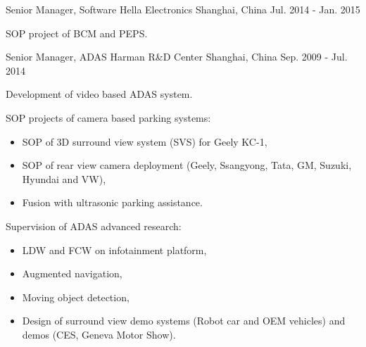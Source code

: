 \documentclass[../resume.tex]{subfiles}
\begin{document}
\begin{cventries}
  \cventry
    {Senior Manager, Software} %
    {Hella Electronics} %
    {Shanghai, China} %
    {Jul. 2014 - Jan. 2015} %
    {
      \begin{cvitems}
        \item SOP project of BCM and PEPS.
      \end{cvitems}
    }

  \cventry
    {Senior Manager, ADAS} %
    {Harman R\&D Center} %
    {Shanghai, China} %
    {Sep. 2009 - Jul. 2014} %
    {
      \begin{cvitems}
        \item Development of video based ADAS system.
        \item SOP projects of camera based parking systems:
          \begin{itemize}
            \item SOP of 3D surround view system (SVS) for Geely KC-1,
            \item SOP of rear view camera deployment (Geely, Ssangyong, Tata, GM, Suzuki, Hyundai and VW),
            \item Fusion with ultrasonic parking assistance.
           \end{itemize}
        \item Supervision of ADAS advanced research:
          \begin{itemize}
            \item LDW and FCW on infotainment platform,
            \item Augmented navigation,
            \item Moving object detection,
            \item Design of surround view demo systems (Robot car and OEM vehicles) and demos (CES, Geneva Motor Show).
          \end{itemize}
      \end{cvitems}
    }
\end{cventries}
\end{document}
